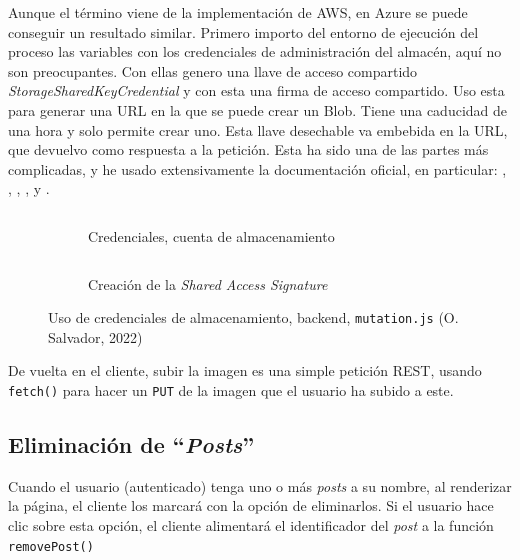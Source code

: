 \documentclass[11pt]{article}
\begin{document}
\begin{flushleft}
	Aunque el término viene de la implementación de AWS, en Azure se puede conseguir un resultado similar. Primero importo del entorno de ejecución del proceso las variables con los credenciales de administración del almacén, aquí no son preocupantes. Con ellas genero una llave de acceso compartido \textit{StorageSharedKeyCredential} y con esta una firma de acceso compartido. Uso esta para generar una URL en la que se puede crear un Blob. Tiene una caducidad de una hora y solo permite crear uno. Esta llave desechable va embebida en la URL, que devuelvo como respuesta a la petición. Esta ha sido una de las partes más complicadas, y he usado extensivamente la documentación oficial, en particular: \cite{ms_add_blob1}, \cite{ms_add_blob2}, \cite{ms_add_blob3}, \cite{ms_add_blob4}, y \cite{ms_add_blob5}.
	\linebreak
	
		\begin{figure}[htb]
			\centering
			\begin{subfigure}{0.41\textwidth}
				\inputminted[fontsize=\scriptsize, firstline=24, lastline=27, frame=single, breaklines, gobble=7]{javascript}{../../backend/src/resolvers/mutation.js}
				\vspace{.45cm}
				\caption{Credenciales, cuenta de almacenamiento}
			\end{subfigure}
			\hspace{1cm}
			\begin{subfigure}{0.5\textwidth}
				\inputminted[fontsize=\scriptsize, firstline=34, lastline=38, frame=single, breaklines, gobble=7]{javascript}{../../backend/src/resolvers/mutation.js}
				\caption{Creación de la \textit{Shared Access Signature}}
			\end{subfigure}
						
			\caption{Uso de credenciales de almacenamiento, backend, \texttt{mutation.js} (O. Salvador, 2022)}
		\end{figure}
		
	De vuelta en el cliente, subir la imagen es una simple petición REST, usando \texttt{fetch()} para hacer un \texttt{PUT} de la imagen que el usuario ha subido a este.

	
	
	\clearpage
	\subsection{Eliminación de ``\textit{Posts}''}
	Cuando el usuario (autenticado) tenga uno o más \textit{posts} a su nombre, al renderizar la página, el cliente los marcará con la opción de eliminarlos. Si el usuario hace clic sobre esta opción, el cliente alimentará el identificador del \textit{post} a la función \texttt{removePost()} 
	\linebreak
	

\end{flushleft}
\end{document}
